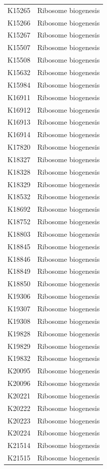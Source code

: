 \begin{longtable}{@{}l l@{}}
K15265 & Ribosome biogenesis \\
K15266 & Ribosome biogenesis \\
K15267 & Ribosome biogenesis \\
K15507 & Ribosome biogenesis \\
K15508 & Ribosome biogenesis \\
K15632 & Ribosome biogenesis \\
K15984 & Ribosome biogenesis \\
K16911 & Ribosome biogenesis \\
K16912 & Ribosome biogenesis \\
K16913 & Ribosome biogenesis \\
K16914 & Ribosome biogenesis \\
K17820 & Ribosome biogenesis \\
K18327 & Ribosome biogenesis \\
K18328 & Ribosome biogenesis \\
K18329 & Ribosome biogenesis \\
K18532 & Ribosome biogenesis \\
K18692 & Ribosome biogenesis \\
K18752 & Ribosome biogenesis \\
K18803 & Ribosome biogenesis \\
K18845 & Ribosome biogenesis \\
K18846 & Ribosome biogenesis \\
K18849 & Ribosome biogenesis \\
K18850 & Ribosome biogenesis \\
K19306 & Ribosome biogenesis \\
K19307 & Ribosome biogenesis \\
K19308 & Ribosome biogenesis \\
K19828 & Ribosome biogenesis \\
K19829 & Ribosome biogenesis \\
K19832 & Ribosome biogenesis \\
K20095 & Ribosome biogenesis \\
K20096 & Ribosome biogenesis \\
K20221 & Ribosome biogenesis \\
K20222 & Ribosome biogenesis \\
K20223 & Ribosome biogenesis \\
K20224 & Ribosome biogenesis \\
K21514 & Ribosome biogenesis \\
K21515 & Ribosome biogenesis \\

\end{longtable}
